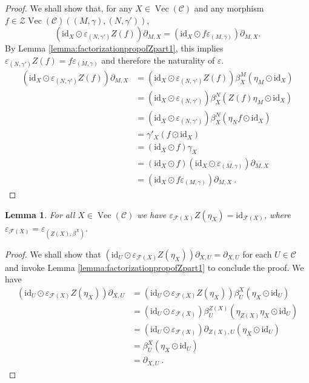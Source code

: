 \documentclass[a4paper,11pt,reqno]{amsart}
\numberwithin{equation}{section}
\newtheorem{lemma}[theorem]{Lemma}
\theoremstyle{remark}
\theoremstyle{definition}
\newcommand{\cC}{\mathcal C}
\newcommand{\cF}{\mathcal F}
\newcommand{\cZ}{\mathcal Z}
\DeclareMathOperator{\Vect}{Vec}
\newcommand{\id}{\mathrm{id}}
\begin{document}
\begin{proof}
	We shall show that, for any $X \in \Vect(\cC)$ and any morphism $f \in \cZ \Vect(\cC)((M,\gamma),(N,\gamma'))$,
	\[
	(\id_X \odot \varepsilon_{(N,\gamma')}Z(f)) \partial_{M,X} = (\id_X \odot f \varepsilon_{(M,\gamma)}) \partial_{M,X}.
	\]
	By Lemma \ref{lemma:factorizationpropofZpart1}, this implies $\varepsilon_{(N,\gamma')}Z(f) = f \varepsilon_{(M,\gamma)}$ and therefore the naturality of $\varepsilon$.
	\begin{align*}
		(\id_X \odot \varepsilon_{(N,\gamma')}Z(f)) \partial_{M,X} & = (\id_X \odot \varepsilon_{(N,\gamma')}Z(f)) \beta^M_X (\eta_M \odot \id_X) \\
		& = (\id_X \odot \varepsilon_{(N,\gamma')})\beta^N_X (Z(f) \eta_M \odot \id_X) \\
		& = (\id_X \odot \varepsilon_{(N,\gamma')})\beta^N_X (\eta_N f \odot \id_X) \\
		& = \gamma'_X (f \odot \id_X) \\
		& = (\id_X \odot f)\gamma_X
		\\
		& = (\id_X \odot f)(\id_X \odot \varepsilon_{(M,\gamma)})\partial_{M,X} \\
		& = (\id_X \odot f \varepsilon_{(M,\gamma)}) \partial_{M,X} \ . 
	\end{align*}
\end{proof}

\begin{lemma}
	For all $X \in \Vect(\cC)$ we have $\varepsilon_{\cF(X)} Z(\eta_X) = \id_{\cF(X)}$, where $\varepsilon_{\cF(X)} = \varepsilon_{(Z(X),\beta^X)}$.
\end{lemma}

\begin{proof}
	We shall show that $(\id_U \odot \varepsilon_{\cF(X)}Z(\eta_X)) \partial_{X,U} = \partial_{X,U}$ for each $U \in \cC$ and invoke Lemma \ref{lemma:factorizationpropofZpart1} to conclude the proof. We have
	\begin{align*}
		(\id_U \odot \varepsilon_{\cF(X)}Z(\eta_X)) \partial_{X,U} & = (\id_U \odot \varepsilon_{\cF(X)}Z(\eta_X)) \beta^X_U (\eta_X \odot \id_U) \\
		&= (\id_U \odot \varepsilon_{\cF(X)}) \beta^{Z(X)}_U (\eta_{Z(X)} \eta_X \odot \id_U) \\
		& = (\id_U \odot \varepsilon_{\cF(X)}) \partial_{Z(X),U}(\eta_X \odot \id_U) \\
		& = \beta^X_U (\eta_X \odot \id_U) \\
		& = \partial_{X,U} \ .
	\end{align*}
\end{proof}
\end{document}
